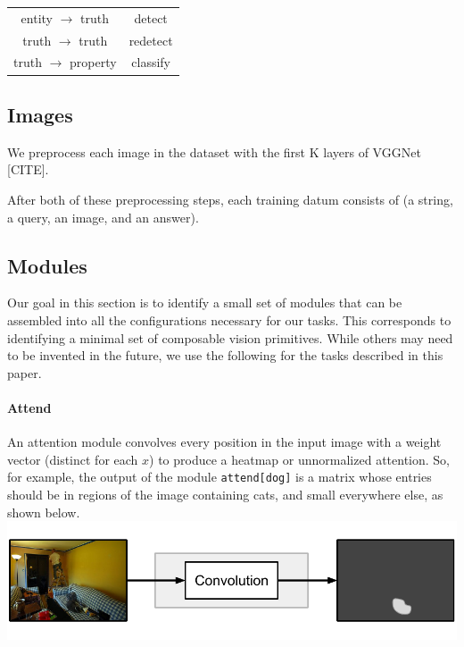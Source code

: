 \documentclass[10pt,twocolumn,letterpaper]{article}
\begin{document}
\begin{tabular}{cc}
  entity $\to$ truth & detect \\
  truth $\to$ truth & redetect \\
  truth $\to$ property & classify \\
\end{tabular}

\subsection{Images}

We preprocess each image in the dataset with the first K layers of VGGNet [CITE].

After both of these preprocessing steps, each training datum consists of (a
string, a query, an image, and an answer).

\subsection{Modules}

Our goal in this section is to identify a small set of modules that can be
assembled into all the configurations necessary for our tasks. This corresponds
to identifying a minimal set of composable vision primitives. While others  may
need to be invented in the future, we use the following for the tasks described
in this paper.\\

\paragraph{Attend}

An attention module  convolves every position in the input image with a weight vector (distinct for each $x$) to produce a heatmap or unnormalized attention. So, for example, the output of the module {\small\tt attend[dog]} is a matrix whose entries should be in regions of the image containing cats, and small everywhere else, as shown below.\\[1em]
\includegraphics[width=\columnwidth]{fig/attend}
\end{document}
